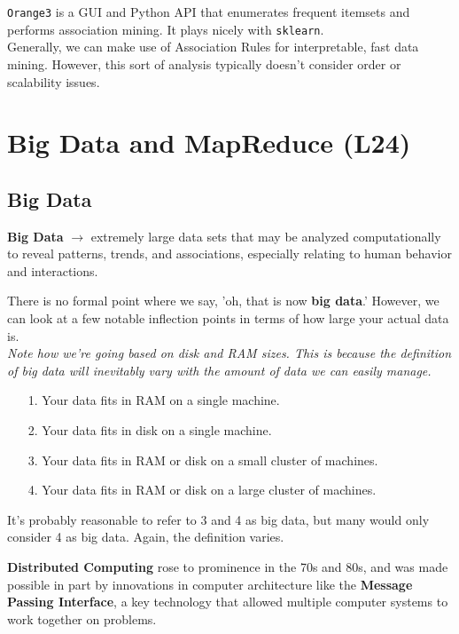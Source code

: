 \documentclass[english, 10pt]{article}
\begin{document}
\texttt{Orange3} is a GUI and Python API that enumerates frequent itemsets and performs association mining. It plays nicely with \texttt{sklearn}.\\

Generally, we can make use of Association Rules for interpretable, fast data mining. However, this sort of analysis typically doesn't consider order or scalability issues.

\section{Big Data and MapReduce (L24)}

\subsection{Big Data}

\begin{tcolorbox}[title=Definition:,colframe=red!75!black,colback=red!5!white,arc=0pt,fonttitle=\bfseries]
\textbf{Big Data} $\rightarrow$ extremely large data sets that may be analyzed computationally to reveal patterns, trends, and associations, especially relating to human behavior and interactions.
\end{tcolorbox}

\hfill \break There is no formal point where we say, 'oh, that is now \textbf{big data}.' However, we can look at a few notable inflection points in terms of how large your actual data is. \\

\textit{Note how we're going based on disk and RAM sizes. This is because the definition of big data will inevitably vary with the amount of data we can easily manage.}

\begin{itemize}
	\item[1.] Your data fits in RAM on a single machine.
	\item[2.] Your data fits in disk on a single machine.
	\item[3.] Your data fits in RAM or disk on a small cluster of machines.
	\item[4.] Your data fits in RAM or disk on a large cluster of machines.
\end{itemize}

It's probably reasonable to refer to 3 and 4 as big data, but many would only consider 4 as big data. Again, the definition varies.

\textbf{Distributed Computing} rose to prominence in the 70s and 80s, and was made possible in part by innovations in computer architecture like the \textbf{Message Passing Interface}, a key technology that allowed multiple computer systems to work together on problems.\\
\end{document}
